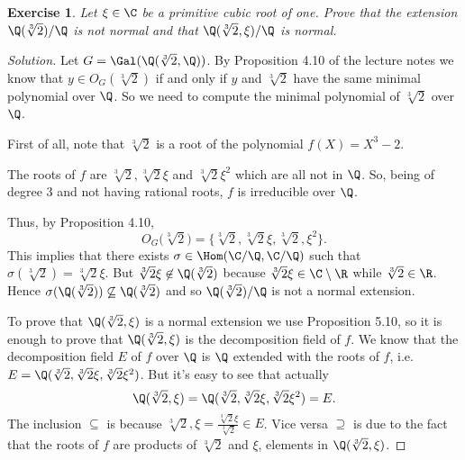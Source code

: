 \documentclass[a4paper,10pt,reqno]{amsart}
\newtheorem{ex}{Exercise}[section]
\newenvironment{sol}
  {\renewcommand\qedsymbol{$\blacksquare$}\begin{proof}[Solution]}
  {\end{proof}}
\begin{document}
\begin{ex}
\label{5.1}
    Let $\xi\in\C$ be a primitive cubic root of one.
    Prove that the extension $\Q(\sqrt[3]{2})/\Q$ is not normal and that $\Q(\sqrt[3]{2},\xi)/\Q$ is normal.
\end{ex}
\begin{sol}
Let $G=\Gal(\Q(\sqrt[3]{2},\Q))$.
By Proposition 4.10 of the lecture notes we know that
$y\in O_G(\sqrt[3]{2})$ if and only if $y$ and 
$\sqrt[3]{2}$ have the same minimal polynomial over $\Q$.
So we need to compute the minimal polynomial of $\sqrt[3]{2}$ over $\Q$.

First of all, note that $\sqrt[3]{2}$ is a root of
the polynomial $f(X)=X^3-2$.

The roots of $f$ are $\sqrt[3]{2},\sqrt[3]{2}\xi$ and $\sqrt[3]{2}\xi^2$ which are all not in $\Q$.
So, being of degree 3 and not having rational roots, $f$ is irreducible over $\Q$.

Thus, by Proposition 4.10, 
\[
O_G\big(\sqrt[3]{2}\big)=\{\sqrt[3]{2},\sqrt[3]{2}\xi,\sqrt[3]{2},\xi^2\}.
\]
This implies that there exists $\sigma\in \Hom(\C/\Q,\C/\Q)$ such that $\sigma(\sqrt[3]{2})=\sqrt[3]{2}\xi$.
But $\sqrt[3]{2}\xi\not \in \Q(\sqrt[3]{2})$
because $\sqrt[3]{2}\xi\in\C\setminus\R$ while 
$\sqrt[3]{2}\in \R$. 
Hence $\sigma(\Q(\sqrt[3]{2}))\not\subseteq \Q(\sqrt[3]{2})$ and so $\Q(\sqrt[3]{2})/\Q$ is not a normal extension.

To prove that $\Q(\sqrt[3]{2},\xi)$ is a normal extension 
we use Proposition 5.10, so it is enough to prove
that $\Q(\sqrt[3]{2},\xi)$ is the decomposition field of $f$.
We know that the decomposition field $E$ of $f$ over $\Q$ is
$\Q$ extended with the roots of $f$, i.e.
$E=\Q(\sqrt[3]{2},\sqrt[3]{2}\xi,\sqrt[3]{2}\xi^2)$.
But it's easy to see that actually 
\[
\Q(\sqrt[3]{2},\xi)=\Q(\sqrt[3]{2},\sqrt[3]{2}\xi,\sqrt[3]{2}\xi^2)=E.
\]
The inclusion $\subseteq$ is because $\sqrt[3]{2},  \xi=\frac{\sqrt[3]{2}\xi}{\sqrt[3]{2}}\in E$. 
Vice versa $\supseteq$ is due to the fact that 
the roots of $f$ are products of $\sqrt[3]{2}$ and $\xi$, elements in $\Q(\sqrt[3]{2},\xi)$.
\end{sol}
\end{document}
